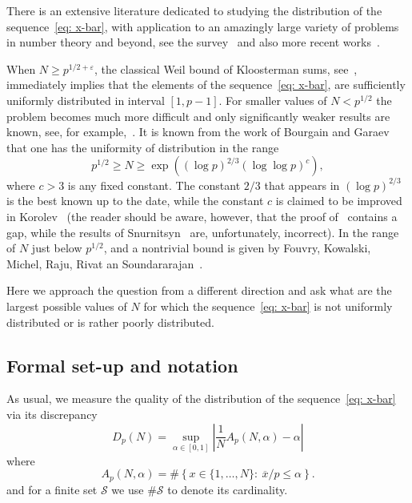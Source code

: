\documentclass[12pt]{amsart}
\numberwithin{equation}{section}
\numberwithin{theorem}{section}
\numberwithin{table}{section}
\numberwithin{figure}{section}
\def\cS{{\mathcal S}}
\def\le{\leqslant}
\def\ge{\geqslant}
\def\xbar{\overline{x}}
\def\({\left(}
\def\){\right)}
\begin{document}
There is an extensive literature dedicated to studying the distribution 
of the sequence~\eqref{eq: x-bar}, with application to an amazingly large variety
of problems in number theory and beyond, see the survey~\cite{Shp} and also more recent works~\cite{Baier,BrHay,Chan,Hump,Ust}.

When $N \ge p^{1/2+\varepsilon}$, the classical Weil bound of Kloosterman sums,
see~\cite[Theorem~11.11]{IwKow}, immediately implies that the elements of the sequence~\eqref{eq: x-bar},
are sufficiently uniformly distributed in interval $[1, p-1]$. For smaller values of $N< p^{1/2}$ the problem becomes 
much more difficult and only significantly  weaker results are known, see, for example,~\cite{BG,Kar1,Kar2, Kor, Kor1, Kor2}. 
It is known from the work of Bourgain and Garaev~\cite{BG} that one has the  uniformity of distribution in the range
\begin{equation}
\label{eq: NontrivBound}
p^{1/2}\ge N \ge \exp\(\(\log p\)^{2/3}(\log\log p)^{c} \), 
\end{equation}
where  $c>3$ is any fixed constant. The constant $2/3$ that appears in  $(\log p)^{2/3}$ is the best known up to the date, while the constant $c$ is claimed to be improved in Korolev~\cite[Theorem~2]{Kor2} (the reader should be aware, however, that the proof of~\cite[Lemma~2]{Kor2} contains a gap, 
while the results of Snurnitsyn~\cite{Snur} are, unfortunately, incorrect). In the range of $N$ just below $p^{1/2}$, 
and a nontrivial bound is given by Fouvry,   Kowalski,
 Michel,  Raju,  Rivat an  Soundararajan~\cite[Corollary~1.7]{FKMRRS}.  


Here we approach the question from a different direction and ask what are the largest possible values of $N$ 
for which the sequence~\eqref{eq: x-bar} is not uniformly distributed or is rather poorly distributed. 

\subsection{Formal set-up and notation} 
As usual, we measure the quality of the distribution of the sequence~\eqref{eq: x-bar}
via its discrepancy 
\begin{equation}
\label{eq: DpN}
D_p(N) = \sup_{\alpha \in [0,1]} \left| \frac{1}{N} A_p(N, \alpha) - \alpha  \right|
\end{equation}
where
$$A_p(N, \alpha) =\#\left\{x\in \{1, \ldots, N\}:~ \xbar/p \le \alpha\right\}.
$$
and  for a finite set $\cS$ we use $\# \cS$ to denote its cardinality. 
\end{document}

